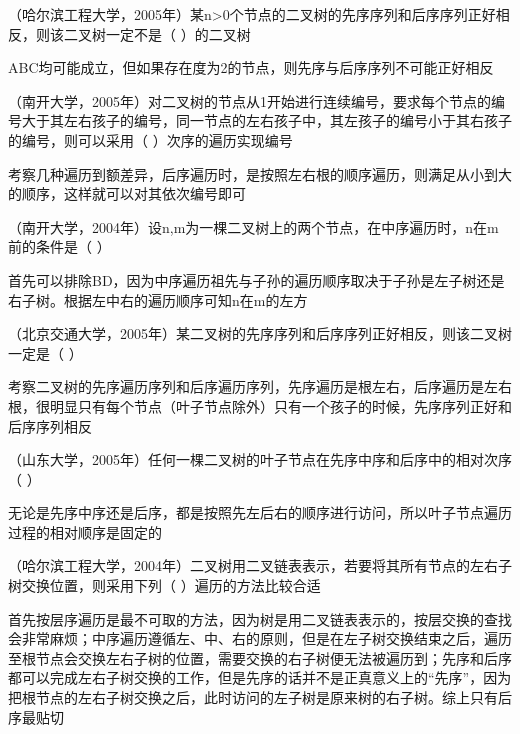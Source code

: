 \question （哈尔滨工程大学，2005年）某n\textgreater{}0个节点的二叉树的先序序列和后序序列正好相反，则该二叉树一定不是（
）的二叉树
\par{}
\begin{solution}ABC均可能成立，但如果存在度为2的节点，则先序与后序序列不可能正好相反
\end{solution}
\question （南开大学，2005年）对二叉树的节点从1开始进行连续编号，要求每个节点的编号大于其左右孩子的编号，同一节点的左右孩子中，其左孩子的编号小于其右孩子的编号，则可以采用（
）次序的遍历实现编号
\par{}
\begin{solution}考察几种遍历到额差异，后序遍历时，是按照左右根的顺序遍历，则满足从小到大的顺序，这样就可以对其依次编号即可
\end{solution}
\question （南开大学，2004年）设n,m为一棵二叉树上的两个节点，在中序遍历时，n在m前的条件是（
）
\par{}
\begin{solution}首先可以排除BD，因为中序遍历祖先与子孙的遍历顺序取决于子孙是左子树还是右子树。根据左中右的遍历顺序可知n在m的左方
\end{solution}
\question （北京交通大学，2005年）某二叉树的先序序列和后序序列正好相反，则该二叉树一定是（
）
\par{}
\begin{solution}考察二叉树的先序遍历序列和后序遍历序列，先序遍历是根左右，后序遍历是左右根，很明显只有每个节点（叶子节点除外）只有一个孩子的时候，先序序列正好和后序序列相反
\end{solution}
\question （山东大学，2005年）任何一棵二叉树的叶子节点在先序中序和后序中的相对次序（
）
\par{}
\begin{solution}无论是先序中序还是后序，都是按照先左后右的顺序进行访问，所以叶子节点遍历过程的相对顺序是固定的
\end{solution}
\question （哈尔滨工程大学，2004年）二叉树用二叉链表表示，若要将其所有节点的左右子树交换位置，则采用下列（
）遍历的方法比较合适
\par{}
\begin{solution}首先按层序遍历是最不可取的方法，因为树是用二叉链表表示的，按层交换的查找会非常麻烦；中序遍历遵循左、中、右的原则，但是在左子树交换结束之后，遍历至根节点会交换左右子树的位置，需要交换的右子树便无法被遍历到；先序和后序都可以完成左右子树交换的工作，但是先序的话并不是正真意义上的``先序''，因为把根节点的左右子树交换之后，此时访问的左子树是原来树的右子树。综上只有后序最贴切
\end{solution}

